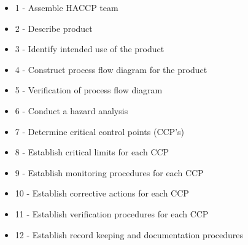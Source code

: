 \begin{highlight}
    \begin{itemize}
        \item 1 -  Assemble HACCP team
        \item 2 -  Describe product
        \item 3 -  Identify intended use of the product
        \item 4 -  Construct process flow diagram for the product
        \item 5 -  Verification of process flow diagram
        \item 6 -  Conduct a hazard analysis
        \item 7 -  Determine critical control points (CCP’s)
        \item 8 -  Establish critical limits for each CCP
        \item 9 -  Establish monitoring procedures for each CCP
        \item 10 - Establish corrective actions for each CCP
        \item 11 - Establish verification procedures for each CCP
        \item 12 - Establish record keeping and documentation procedures
    \end{itemize}
\end{highlight}

